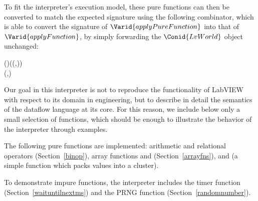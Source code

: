 \begin{hscode}\SaveRestoreHook
{}%
%
\>[B]{}\mathbin{::}\to {}\<[E]%
\ColumnHook
\end{hscode}\resethooks

To fit the interpreter's execution model, these pure functions can then be
converted to match the expected signature using the following combinator,
which is able to convert the signature of \ensuremath{\Varid{applyPureFunction}} into that of
\ensuremath{\Varid{applyFunction}}, by simply forwarding the \ensuremath{\Conid{LvWorld}} object unchanged:

\begin{hscode}\SaveRestoreHook
{}%
%
\>[B]{}\mathbin{::}(\to {})\to (\to {}\to (,)){}\<[E]%
\\
\>[B]{}\;\mathrel{=}\lambda {}\;\to (,\;){}\<[E]%
\ColumnHook
\end{hscode}\resethooks

Our goal in this interpreter is not to reproduce the functionality of LabVIEW
with respect to its domain in engineering, but to describe in detail the
semantics of the dataflow language at its core. For this reason, we include
below only a small selection of functions, which should be enough to
illustrate the behavior of the interpreter through examples.

The following pure functions are implemented: arithmetic and relational
operators (Section~\ref{binop}), array functions  and
 (Section~\ref{arrayfns}), and  (a simple function
which packs values into a cluster).

To demonstrate impure functions, the interpreter includes the timer
function  (Section~\ref{waituntilnextms}) and the
PRNG function  (Section~\ref{randomnumber}).

